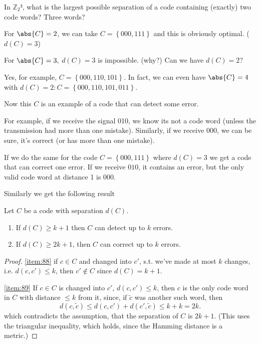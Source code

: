 \documentclass[english]{lbscript}
\begin{document}
\begin{example}{}{}
	In \(ℤ_{2}³\), what is the largest possible separation of a code containing (exactly) two code words? Three words?

	For \(\abs{C}=2\), we can take \(C=\left\{ 000, 111 \right\} \) and this is obviously optimal. (\(d(C)=3\))

	For \(\abs{C}=3, \) \(d(C)=3\) is impossible. (why?) Can we have \(d(C)=2\)?

	Yes, for example, \(C=\left\{ 000, 110, 101 \right\} \). In fact, we can even have \(\abs{C}=4\) with \(d(C)=2: C=\left\{ 000, 110, 101, 011 \right\} \).

	Now this \(C\) is an example of a code that can detect some error.

	For example, if we receive the signal 010, we know its not a code word (unless the transmission had more than one mistake). Similarly, if we receive 000, we can be sure, it's correct (or has more than one mistake).

	If we do the same for the code \(C=\left\{ 000, 111 \right\} \) where \(d(C)=3\) we get a code that can correct one error. If we receive \(010\), it contains an error, but the only valid code word at distance 1 is 000.
\end{example}

Similarly we get the following result
\begin{theorem}{}{}
	Let \(C\) be a code with separation \(d(C)\).
	\begin{enumerate}
		\item\label{item:88} If \(d(C)≥k+1\) then \(C\) can detect up to \(k\) errors.
		\item\label{item:89} If \(d(C)≥2k+1\), then \(C\) can correct up to \(k\) errors.
	\end{enumerate}
\end{theorem}
\begin{proof}
	\ref{item:88} if \(c∈C\) and changed into \(c'\), s.t. we've made at most \(k\) changes, i.e. \(d(c, c')≤k\), then \(c'∉C\) since \(d(C)=k+1\).

	\ref{item:89} If \(c∈C\) is changed into \(c'\), \(d(c,c')≤k\), then \(c\) is the only code word in \(C\) with distance \(≤k\) from it, since, if \(\tilde{c}\) was another such word, then
	\begin{equation}
		\label{eq:132}
		d(c, \tilde{c}) ≤ d(c, c')+d(c', \tilde{c}) ≤ k+k=2k.
	\end{equation}
	which contradicts the assumption, that the separation of \(C\) is \(2k+1\). (This uses the triangular inequality, which holds, since the Hamming distance is a metric.)
\end{proof}
\end{document}

